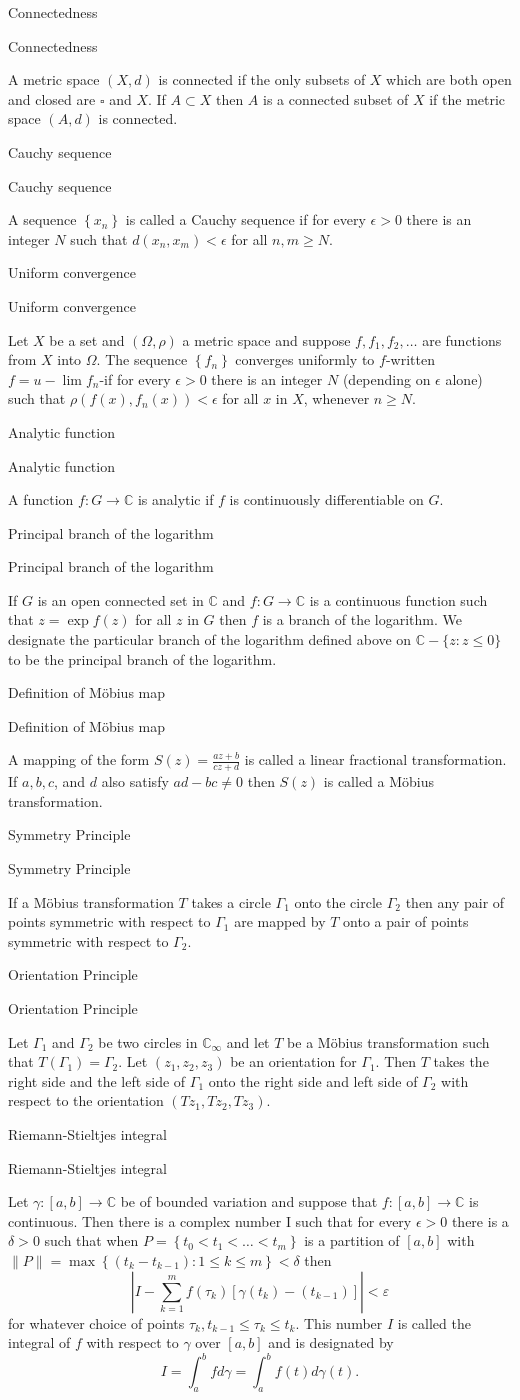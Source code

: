\documentclass[17pt]{extarticle}
\newcommand{\C}{\mathbb{C}}
\newcommand{\abs}[1]{\left\vert#1\right\vert}
\newcommand{\LP}{\left(}
\newcommand{\RP}{\right)}
\newcommand{\LB}{\left[}
\newcommand{\RB}{\right]}
\newcommand{\boxset}[2]{\begin{mdframed}[style=darkQuesion]
#1
\end{mdframed}
\newpage
\begin{mdframed}[style=darkQuesion]
  #1
    \end{mdframed}
\begin{mdframed}[style=darkAnswer]
  #2
    \end{mdframed}
    \newpage
}
\begin{document}
\par
\newpage
\boxset{Connectedness}
{ A metric space $(X, d)$ is connected if the only subsets of $X$ which are both open and closed are $\square$ and $X$. If $A \subset X$ then $A$ is a connected subset of $X$ if the metric space $(A, d)$ is connected.}
\boxset{Cauchy sequence}
{ A sequence $\left\{x_{n}\right\}$ is called a Cauchy sequence if for every $\epsilon>0$ there is an integer $N$ such that $d\left(x_{n}, x_{m}\right)<\epsilon$ for all $n, m \geq N$.}
\boxset{Uniform convergence}
{Let $X$ be a set and $(\Omega, \rho)$ a metric space and suppose $f, f_{1}, f_{2}, \ldots$ are functions from $X$ into $\Omega$. The sequence $\left\{f_{n}\right\}$ converges uniformly to $f$-written $f=u-\lim f_{n}$-if for every $\epsilon>0$ there is an integer $N$ (depending on $\epsilon$ alone) such that $\rho\left(f(x), f_{n}(x)\right)<\epsilon$ for all $x$ in $X$, whenever $n \geq N$.}
\boxset{Analytic function}
{ A function $f: G \rightarrow \C$ is analytic if $f$ is continuously differentiable on $G$.}
\boxset{Principal branch of the logarithm}
{ If $G$ is an open connected set in $\C$ and $f: G \rightarrow \C$ is a continuous function such that $z=\exp f(z)$ for all $z$ in $G$ then $f$ is a branch of the logarithm.
We designate the particular branch of the logarithm defined above on $\C-\{z: z \leq 0\}$ to be the principal branch of the logarithm.}
\boxset{Definition of Möbius map}
{ A mapping of the form $S(z)=\frac{a z+b}{c z+d}$ is called a linear fractional transformation. If $a, b, c$, and $d$ also satisfy $a d-b c \neq 0$ then $S(z)$ is called a Möbius transformation.}
\boxset{Symmetry Principle}
{ If a Möbius transformation $T$ takes a circle $\Gamma_{1}$ onto the circle $\Gamma_{2}$ then any pair of points symmetric with respect to $\Gamma_{1}$ are mapped by $T$ onto a pair of points symmetric with respect to $\Gamma_{2}$.}
\boxset{Orientation Principle}
{ Let $\Gamma_{1}$ and $\Gamma_{2}$ be two circles in $\C_{\infty}$ and let $T$ be a Möbius transformation such that $T\left(\Gamma_{1}\right)=\Gamma_{2}$. Let $\left(z_{1}, z_{2}, z_{3}\right)$ be an orientation for $\Gamma_{1}$. Then $T$ takes the right side and the left side of $\Gamma_{1}$ onto the right side and left side of $\Gamma_{2}$ with respect to the orientation $\left(T z_{1}, T z_{2}, T z_{3}\right)$.}
\boxset{Riemann-Stieltjes integral}
{ Let $\gamma:[a, b] \rightarrow \C$ be of bounded variation and suppose that $f:[a, b] \rightarrow \C$ is continuous. Then there is a complex number I such that for every $\epsilon>0$ there is a $\delta>0$ such that when $P=\left\{t_{0}<t_{1}<\ldots<t_{m}\right\}$ is a partition of $[a, b]$ with $\|P\|=\max \left\{\left(t_{k}-t_{k-1}\right): 1 \leq k \leq m\right\}<\delta$ then
\[\abs{I-\sum_{k=1}^m f\LP\tau_k\RP\LB\gamma\LP t_k\RP-\LP t_{k-1}\RP\RB}<\varepsilon\]
for whatever choice of points $\tau_{k}, t_{k-1} \leq \tau_{k} \leq t_{k}$.
This number $I$ is called the integral of $f$ with respect to $\gamma$ over $[a, b]$ and is designated by
\[I=\int_{a}^{b} f d \gamma=\int_{a}^{b} f(t) d \gamma(t) .\]
}
\end{document}
